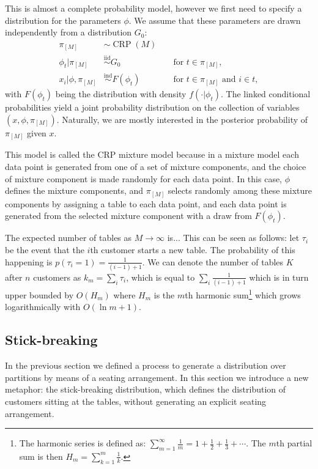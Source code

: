 This is almost a complete probability model, however we first need to specify a distribution for the parameters $\phi$. We assume that these parameters are drawn independently from a distribution $G_0$:
\begin{align}
	\pi_{[M]} &\sim \operatorname{CRP}(M)\label{eq:CRPMMpartition} \\
    \phi_t | \pi_{[M]} &\overset{\text{iid}}{\sim} G_0 && \text{ for }t\in\pi_{[M]},\label{eq:CRPMMlatent} \\
    x_i|\phi,\pi_{[M]} &\overset{\text{ind}}{\sim} F(\phi_t) && \text{ for }t\in\pi_{[M]}\text{ and }i\in t,\label{eq:CRPMMdatapoints}
\end{align}
with $F(\phi_t)$ being the distribution with density $f(\cdot|\phi_t)$. The linked conditional probabilities yield a joint probability distribution on the collection of variables $(x,\phi,\pi_{[M]})$. Naturally, we are mostly interested in the posterior probability of $\pi_{[M]}$ given $x$.

This model is called the CRP mixture model because in a mixture model each data point is generated from one of a set of mixture components, and the choice of mixture component is made randomly for each data point. In this case, $\phi$ defines the mixture components, and $\pi_{[M]}$ selects randomly among these mixture components by assigning a table to each data point, and each data point is generated from the selected mixture component with a draw from $F(\phi_t)$.

The expected number of tables as $M \rightarrow \infty$ is... This can be seen as follows: let $\tau_i$ be the event that the $i$th customer starts a new table. The probability of this happening is $p(\tau_i = 1) = \frac{1}{(i-1)+1}$. We can denote the number of tables $K$ after $n$ customers as $k_m = \sum_i \tau_i$, which is equal to $\sum_i \frac{1}{(i-1)+1}$ which is in turn upper bounded by $O(H_m)$ where $H_m$ is the $m$th harmonic sum\footnote{The harmonic series is defined as: $\sum_{m=1}^\infty \frac{1}{m} = 1 + \frac{1}{2} + \frac{1}{3} + \cdots$. The $m$th partial sum is then $H_m=\sum_{k=1}^m \frac{1}{k}$.} which grows logarithmically with $O(\ln m+1)$. %
%
%



\subsection{Stick-breaking}
In the previous section we defined a process to generate a distribution over partitions by means of a seating arrangement. In this section we introduce a new metaphor: the stick-breaking distribution, which defines the distribution of customers sitting at the tables, without generating an explicit seating arrangement.

